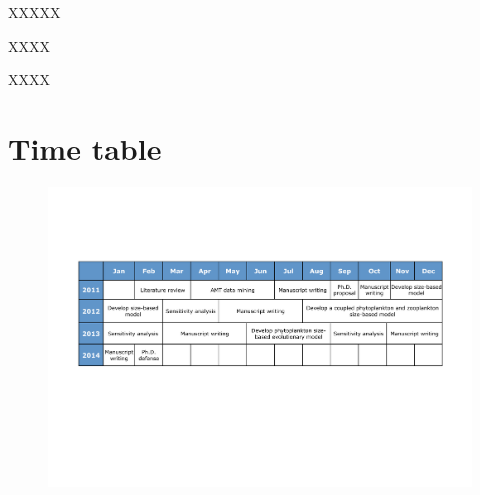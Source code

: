 XXXXX


XXXX

XXXX


\newpage

\section{Time table} 

\begin{figure}[h]
\centering
\includegraphics[trim = 20mm 25mm 20mm 25mm, clip, width=1\linewidth]{./Chp3-Further/Chronogram.pdf}
\end{figure}

